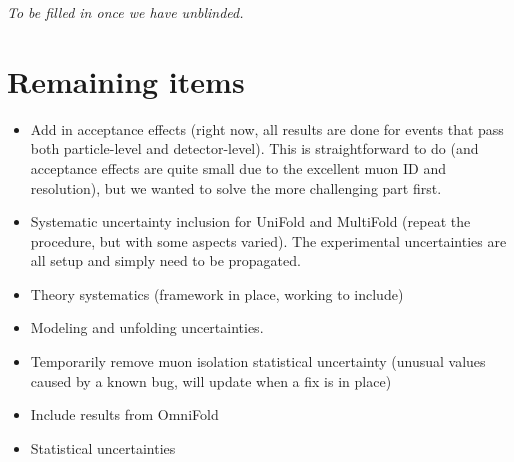 \documentclass[NOTE, atlasdraft=true, texlive=2016, UKenglish]{\ATLASLATEXPATH atlasdoc}
\begin{document}
\textit{To be filled in once we have unblinded.}

\section{Remaining items}

\begin{itemize}
  \item Add in acceptance effects (right now, all results are done for events that pass both particle-level and detector-level).  This is straightforward to do (and acceptance effects are quite small due to the excellent muon ID and resolution), but we wanted to solve the more challenging part first.
  \item Systematic uncertainty inclusion for UniFold and MultiFold (repeat the procedure, but with some aspects varied).  The experimental uncertainties are all setup and simply need to be propagated.
  \item Theory systematics (framework in place, working to include)
  \item Modeling and unfolding uncertainties.
  \item Temporarily remove muon isolation statistical uncertainty (unusual values caused by a known bug, will update when a fix is in place)
  \item Include results from OmniFold
  \item Statistical uncertainties
\end{itemize}


\printbibliography
%
%

\clearpage
\end{document}
